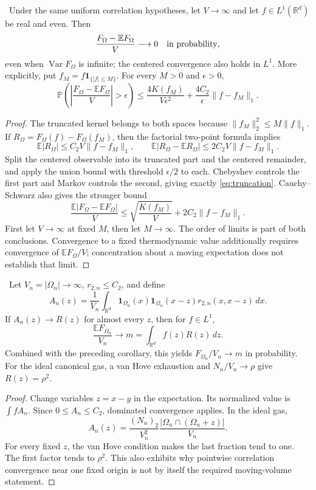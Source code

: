 \begin{corollary}\ours\ 
Under the same uniform correlation hypotheses, let \(V\to\infty\) and let \(f\in L^1(\mathbb R^d)\) be real and even. Then
\[
 \frac{F_\Omega-\mathbb EF_\Omega}{V}\longrightarrow0
 \quad\hbox{in probability},
\]
even when \(\operatorname{Var}F_\Omega\) is infinite; the centered convergence also holds in \(L^1\). More explicitly, put
\(f_M=f\mathbf1_{\{|f|\leq M\}}\). For every \(M>0\) and \(\epsilon>0\),
\begin{equation}
 \mathbb P\!\left(\left|\frac{F_\Omega-\mathbb EF_\Omega}{V}\right|>\epsilon\right)
 \leq\frac{4K(f_M)}{V\epsilon^2}
 +\frac{4C_2}{\epsilon}\|f-f_M\|_1.
 \label{eq:truncation}
\end{equation}
\end{corollary}
\begin{proof}
The truncated kernel belongs to both spaces because
\(\|f_M\|_2^2\leq M\|f\|_1\). If \(R_\Omega=F_\Omega(f)-F_\Omega(f_M)\), then the factorial two-point formula implies
\[
 \mathbb E|R_\Omega|\leq C_2V\|f-f_M\|_1,
 \qquad
 \mathbb E|R_\Omega-\mathbb ER_\Omega|
 \leq2C_2V\|f-f_M\|_1.
\]
Split the centered observable into its truncated part and the centered remainder, and apply the union bound with threshold \(\epsilon/2\) to each. Chebyshev controls the first part and Markov controls the second, giving exactly \eqref{eq:truncation}. Cauchy--Schwarz also gives the stronger bound
\[
 \frac{\mathbb E|F_\Omega-\mathbb EF_\Omega|}{V}
 \leq\sqrt{\frac{K(f_M)}V}+2C_2\|f-f_M\|_1.
\]
First let \(V\to\infty\) at fixed \(M\), then let \(M\to\infty\). The order of limits is part of both conclusions. Convergence to a fixed thermodynamic value additionally requires convergence of \(\mathbb EF_\Omega/V\); concentration about a moving expectation does not establish that limit.
\end{proof}

\begin{proposition}[A sufficient condition identifying the mean]\ours\ 
Let \(V_n=|\Omega_n|\to\infty\), \(r_{2,n}\leq C_2\), and define
\[
 A_n(z)=\frac1{V_n}\int_{\mathbb R^d}
 \mathbf1_{\Omega_n}(x)\mathbf1_{\Omega_n}(x-z)
 r_{2,n}(x,x-z)\,dx.
\]
If \(A_n(z)\to R(z)\) for almost every \(z\), then for \(f\in L^1\),
\[
 \frac{\mathbb EF_{\Omega_n}}{V_n}\longrightarrow
 m=\int_{\mathbb R^d}f(z)R(z)\,dz.
\]
Combined with the preceding corollary, this yields \(F_{\Omega_n}/V_n\to m\) in probability. For the ideal canonical gas, a van Hove exhaustion and \(N_n/V_n\to\rho\) give \(R(z)=\rho^2\).
\end{proposition}
\begin{proof}
Change variables \(z=x-y\) in the expectation. Its normalized value is \(\int fA_n\). Since \(0\leq A_n\leq C_2\), dominated convergence applies. In the ideal gas,
\[
 A_n(z)=\frac{(N_n)_2}{V_n^2}
 \frac{|\Omega_n\cap(\Omega_n+z)|}{V_n}.
\]
For every fixed \(z\), the van Hove condition makes the last fraction tend to one. The first factor tends to \(\rho^2\). This also exhibits why pointwise correlation convergence near one fixed origin is not by itself the required moving-volume statement.
\end{proof}

